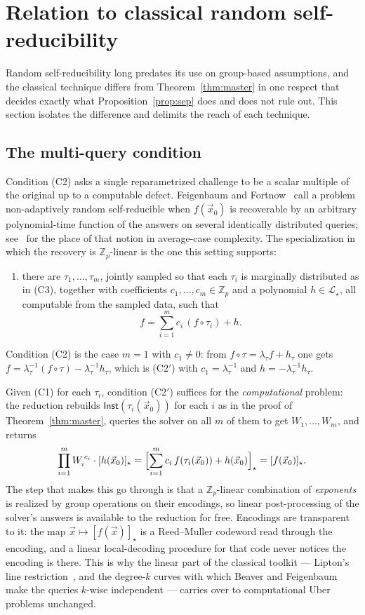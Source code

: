 \documentclass{aicr-solution}
\newcommand{\Zp}{\mathbb{Z}_p}
\newcommand{\vx}{\vec{x}}
\newcommand{\Inst}{\mathsf{Inst}}
\newcommand{\LL}{\mathcal{L}}
\begin{document}
\section{Relation to classical random self-reducibility}
\label{sec:classical}

Random self-reducibility long predates its use on group-based assumptions, and the classical
technique differs from Theorem~\ref{thm:master} in one respect that decides exactly what
Proposition~\ref{prop:sep} does and does not rule out. This section isolates the difference
and delimits the reach of each technique.

\subsection{The multi-query condition}

Condition (C2) asks a single reparametrized challenge to be a scalar multiple of the original
up to a computable defect. Feigenbaum and Fortnow~\cite{FF93} call a problem non-adaptively
random self-reducible when $f(\vx_0)$ is recoverable by an arbitrary polynomial-time function
of the answers on several identically distributed queries; see~\cite{BT06} for the place of
that notion in average-case complexity. The specialization in which the recovery is
$\Zp$-linear is the one this setting supports:
\begin{enumerate}[label=\textup{(C2$'$)},leftmargin=3.9em]
  \item there are $\tau_1,\dots,\tau_m$, jointly sampled so that each $\tau_i$ is marginally
        distributed as in (C3), together with coefficients $c_1,\dots,c_m\in\Zp$ and a
        polynomial $h\in\LL_\star$, all computable from the sampled data, such that
        \[
          f=\sum_{i=1}^{m}c_i\,(f\circ\tau_i)+h.
        \]
\end{enumerate}
Condition (C2) is the case $m=1$ with $c_1\neq 0$: from $f\circ\tau=\lambda_\tau f+h_\tau$ one
gets $f=\lambda_\tau^{-1}(f\circ\tau)-\lambda_\tau^{-1}h_\tau$, which is (C2$'$) with
$c_1=\lambda_\tau^{-1}$ and $h=-\lambda_\tau^{-1}h_\tau$.

Given (C1) for each $\tau_i$, condition (C2$'$) suffices for the \emph{computational} problem:
the reduction rebuilds $\Inst(\tau_i(\vx_0))$ for each $i$ as in the proof of
Theorem~\ref{thm:master}, queries the solver on all $m$ of them to get $W_1,\dots,W_m$, and
returns
\[
  \prod_{i=1}^{m}W_i^{\,c_i}\cdot[h(\vx_0)]_\star
  =\Bigl[\sum_{i=1}^{m}c_i\,f(\tau_i(\vx_0))+h(\vx_0)\Bigr]_\star=[f(\vx_0)]_\star.
\]
The step that makes this go through is that a $\Zp$-linear combination of \emph{exponents} is
realized by group operations on their encodings, so linear post-processing of the solver's
answers is available to the reduction for free. Encodings are transparent to it: the map
$\vx\mapsto[f(\vx)]_\star$ is a Reed--Muller codeword read through the encoding, and a linear
local-decoding procedure for that code never notices the encoding is there. This is why the
linear part of the classical toolkit --- Lipton's line restriction~\cite{Lipton91}, and the
degree-$k$ curves with which Beaver and Feigenbaum~\cite{BF90} make the queries $k$-wise
independent --- carries over to computational Uber problems unchanged.
\end{document}
